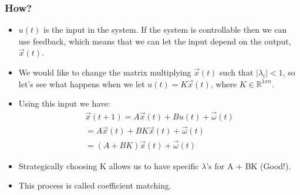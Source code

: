 \documentclass{beamer}
\newcommand{\R}{\mathbb{R}}
\begin{document}
	\begin{frame}
	\frametitle{How?}
	\begin{itemize}
	    \item $u(t)$ is the input in the system. If the system is controllable then we can use feedback, which means that we can let the input depend on the output, $\vec{x}(t)$.
	    \item We would like to change the matrix multiplying $\vec{x}(t)$ such that  $|\lambda_i|<1$, so let's see what happens when we let $u(t) = K\vec{x}(t)$, where $K \in \R^{1xn}$.
	    \item Using this input we have: 
	    \begin{align*}
	        \vec{x}(t+1) = A\vec{x}(t) + Bu(t) + \vec{\omega}(t)\\
	        = A\vec{x}(t) + BK\vec{x}(t) + \vec{\omega}(t)\\
	        = (A + BK)\vec{x}(t) + \vec{\omega}(t)
	    \end{align*}
	  
	    \item Strategically choosing K allows us to have specific $\lambda$'s for A + BK (Good!).
	    \item This process is called coefficient matching. 
	\end{itemize}
	\end{frame}
\end{document}
